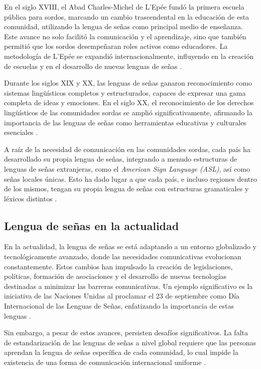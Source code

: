 En el siglo XVIII, el Abad Charles-Michel de L’Epée fundó la primera escuela pública para sordos, marcando un cambio trascendental en la educación de esta comunidad, utilizando la lengua de señas como principal medio de enseñanza. Este avance no solo facilitó la comunicación y el aprendizaje, sino que también permitió que los sordos desempeñaran roles activos como educadores. La metodología de L’Epée se expandió internacionalmente, influyendo en la creación de escuelas y en el desarrollo de nuevas lenguas de señas \cite{RodriguezVelasquezSF}.

Durante los siglos XIX y XX, las lenguas de señas ganaron reconocimiento como sistemas lingüísticos completos y estructurados, capaces de expresar una gama completa de ideas y emociones. En el siglo XX, el reconocimiento de los derechos lingüísticos de las comunidades sordas se amplió significativamente, afirmando la importancia de las lenguas de señas como herramientas educativas y culturales esenciales \cite{RodriguezVelasquezSF}.

A raíz de la necesidad de comunicación en las comunidades sordas, cada país ha desarrollado su propia lengua de señas, integrando a menudo estructuras de lenguas de señas extranjeras, como el \textit{American Sign Language (ASL)}, así como señas locales únicas. Esto ha dado lugar a que cada país, e incluso regiones dentro de los mismos, tengan su propia lengua de señas con estructuras gramaticales y léxicos distintos \cite{RuizVilla2022}.

\subsection{Lengua de señas en la actualidad}

En la actualidad, la lengua de señas se está adaptando a un entorno globalizado y tecnológicamente avanzado, donde las necesidades comunicativas evolucionan constantemente. Estos cambios han impulsado la creación de legislaciones, políticas, formación de asociaciones y el desarrollo de nuevas tecnologías destinadas a minimizar las barreras comunicativas. Un ejemplo significativo es la iniciativa de las Naciones Unidas al proclamar el 23 de septiembre como Día Internacional de las Lenguas de Señas, enfatizando la importancia de estas lenguas \cite{Parada2022}.

Sin embargo, a pesar de estos avances, persisten desafíos significativos. La falta de estandarización de las lenguas de señas a nivel global requiere que las personas aprendan la lengua de señas específica de cada comunidad, lo cual impide la existencia de una forma de comunicación internacional uniforme \cite{RuizVilla2022}.


